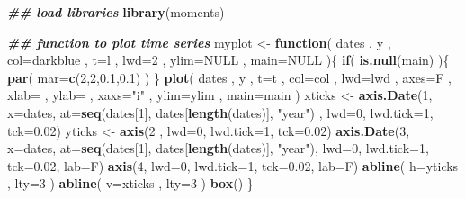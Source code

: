 \documentclass[
]{book}
\newenvironment{Shaded}{\begin{snugshade}}{\end{snugshade}}
\newcommand{\AttributeTok}[1]{\textcolor[rgb]{0.13,0.29,0.53}{#1}}
\newcommand{\ConstantTok}[1]{\textcolor[rgb]{0.56,0.35,0.01}{#1}}
\newcommand{\ControlFlowTok}[1]{\textcolor[rgb]{0.13,0.29,0.53}{\textbf{#1}}}
\newcommand{\DecValTok}[1]{\textcolor[rgb]{0.00,0.00,0.81}{#1}}
\newcommand{\DocumentationTok}[1]{\textcolor[rgb]{0.56,0.35,0.01}{\textbf{\textit{#1}}}}
\newcommand{\FloatTok}[1]{\textcolor[rgb]{0.00,0.00,0.81}{#1}}
\newcommand{\FunctionTok}[1]{\textcolor[rgb]{0.13,0.29,0.53}{\textbf{#1}}}
\newcommand{\NormalTok}[1]{#1}
\newcommand{\OtherTok}[1]{\textcolor[rgb]{0.56,0.35,0.01}{#1}}
\newcommand{\StringTok}[1]{\textcolor[rgb]{0.31,0.60,0.02}{#1}}
\begin{document}
\begin{Shaded}
\begin{Highlighting}[]
\DocumentationTok{\#\# load libraries}
\FunctionTok{library}\NormalTok{(moments)}

\DocumentationTok{\#\# function to plot time series}
\NormalTok{myplot }\OtherTok{\textless{}{-}} \ControlFlowTok{function}\NormalTok{( dates , y , }\AttributeTok{col=}\StringTok{\textquotesingle{}darkblue\textquotesingle{}}\NormalTok{ , }\AttributeTok{t=}\StringTok{\textquotesingle{}l\textquotesingle{}}\NormalTok{ , }\AttributeTok{lwd=}\DecValTok{2}\NormalTok{ , }\AttributeTok{ylim=}\ConstantTok{NULL}\NormalTok{ , }\AttributeTok{main=}\ConstantTok{NULL}\NormalTok{ )\{}
  \ControlFlowTok{if}\NormalTok{( }\FunctionTok{is.null}\NormalTok{(main) )\{ }\FunctionTok{par}\NormalTok{( }\AttributeTok{mar=}\FunctionTok{c}\NormalTok{(}\DecValTok{2}\NormalTok{,}\DecValTok{2}\NormalTok{,}\FloatTok{0.1}\NormalTok{,}\FloatTok{0.1}\NormalTok{) ) \}}
  \FunctionTok{plot}\NormalTok{( dates , y , }\AttributeTok{t=}\NormalTok{t , }\AttributeTok{col=}\NormalTok{col , }\AttributeTok{lwd=}\NormalTok{lwd , }\AttributeTok{axes=}\NormalTok{F , }\AttributeTok{xlab=}\StringTok{\textquotesingle{}\textquotesingle{}}\NormalTok{ , }\AttributeTok{ylab=}\StringTok{\textquotesingle{}\textquotesingle{}}\NormalTok{ , }\AttributeTok{xaxs=}\StringTok{"i"}\NormalTok{ , }\AttributeTok{ylim=}\NormalTok{ylim , }\AttributeTok{main=}\NormalTok{main )}
\NormalTok{  xticks }\OtherTok{\textless{}{-}} \FunctionTok{axis.Date}\NormalTok{(}\DecValTok{1}\NormalTok{, }\AttributeTok{x=}\NormalTok{dates, }\AttributeTok{at=}\FunctionTok{seq}\NormalTok{(dates[}\DecValTok{1}\NormalTok{], dates[}\FunctionTok{length}\NormalTok{(dates)], }\StringTok{"year"}\NormalTok{) , }\AttributeTok{lwd=}\DecValTok{0}\NormalTok{, }\AttributeTok{lwd.tick=}\DecValTok{1}\NormalTok{, }\AttributeTok{tck=}\FloatTok{0.02}\NormalTok{)}
\NormalTok{  yticks }\OtherTok{\textless{}{-}} \FunctionTok{axis}\NormalTok{(}\DecValTok{2}\NormalTok{ , }\AttributeTok{lwd=}\DecValTok{0}\NormalTok{, }\AttributeTok{lwd.tick=}\DecValTok{1}\NormalTok{, }\AttributeTok{tck=}\FloatTok{0.02}\NormalTok{)}
  \FunctionTok{axis.Date}\NormalTok{(}\DecValTok{3}\NormalTok{, }\AttributeTok{x=}\NormalTok{dates, }\AttributeTok{at=}\FunctionTok{seq}\NormalTok{(dates[}\DecValTok{1}\NormalTok{], dates[}\FunctionTok{length}\NormalTok{(dates)], }\StringTok{"year"}\NormalTok{), }\AttributeTok{lwd=}\DecValTok{0}\NormalTok{, }\AttributeTok{lwd.tick=}\DecValTok{1}\NormalTok{, }\AttributeTok{tck=}\FloatTok{0.02}\NormalTok{, }\AttributeTok{lab=}\NormalTok{F)}
  \FunctionTok{axis}\NormalTok{(}\DecValTok{4}\NormalTok{, }\AttributeTok{lwd=}\DecValTok{0}\NormalTok{, }\AttributeTok{lwd.tick=}\DecValTok{1}\NormalTok{, }\AttributeTok{tck=}\FloatTok{0.02}\NormalTok{, }\AttributeTok{lab=}\NormalTok{F)}
  \FunctionTok{abline}\NormalTok{( }\AttributeTok{h=}\NormalTok{yticks , }\AttributeTok{lty=}\DecValTok{3}\NormalTok{ )}
  \FunctionTok{abline}\NormalTok{( }\AttributeTok{v=}\NormalTok{xticks , }\AttributeTok{lty=}\DecValTok{3}\NormalTok{ )}
  \FunctionTok{box}\NormalTok{()}
\NormalTok{\}}
\end{Highlighting}
\end{Shaded}
\end{document}
